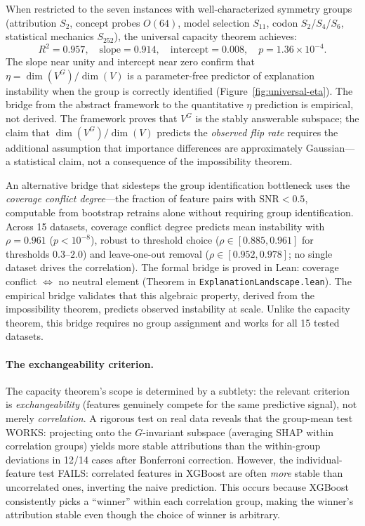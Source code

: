 \documentclass[11pt,a4paper]{article}
\begin{document}
When restricted to the seven instances with well-characterized symmetry groups
(attribution $S_2$, concept probes $O(64)$, model selection $S_{11}$, codon
$S_2$/$S_4$/$S_6$, statistical mechanics $S_{252}$), the universal capacity theorem
achieves:
\begin{equation}
  R^2 = 0.957, \quad \text{slope} = 0.914, \quad \text{intercept} = 0.008,
  \quad p = 1.36 \times 10^{-4}.
  \label{eq:eta-well-characterized}
\end{equation}
The slope near unity and intercept near zero confirm that
$\eta = \dim(V^G)/\dim(V)$ is a parameter-free predictor of explanation
instability when the group is correctly identified
(Figure~\ref{fig:universal-eta}).
The bridge from the abstract framework to the quantitative $\eta$ prediction is empirical, not derived.  The framework proves that $V^G$ is the stably answerable subspace; the claim that $\dim(V^G)/\dim(V)$ predicts the \emph{observed flip rate} requires the additional assumption that importance differences are approximately Gaussian---a statistical claim, not a consequence of the impossibility theorem.

An alternative bridge that sidesteps the group identification bottleneck uses the \emph{coverage conflict degree}---the fraction of feature pairs with $\text{SNR} < 0.5$, computable from bootstrap retrains alone without requiring group identification.  Across 15 datasets, coverage conflict degree predicts mean instability with $\rho = 0.961$ ($p < 10^{-8}$), robust to threshold choice ($\rho \in [0.885, 0.961]$ for thresholds $0.3$--$2.0$) and leave-one-out removal ($\rho \in [0.952, 0.978]$; no single dataset drives the correlation).  The formal bridge is proved in Lean: coverage conflict $\Leftrightarrow$ no neutral element (Theorem in \texttt{ExplanationLandscape.lean}).  The empirical bridge validates that this algebraic property, derived from the impossibility theorem, predicts observed instability at scale.  Unlike the capacity theorem, this bridge requires no group assignment and works for all 15 tested datasets.

\paragraph{The exchangeability criterion.}\label{sec:exchangeability}
The capacity theorem's scope is determined by a subtlety: the relevant criterion is \emph{exchangeability} (features genuinely compete for the same predictive signal), not merely \emph{correlation}.  A rigorous test on real data reveals that the group-mean test WORKS: projecting onto the $G$-invariant subspace (averaging SHAP within correlation groups) yields more stable attributions than the within-group deviations in 12/14 cases after Bonferroni correction.  However, the individual-feature test FAILS: correlated features in XGBoost are often \emph{more} stable than uncorrelated ones, inverting the naive prediction.  This occurs because XGBoost consistently picks a ``winner'' within each correlation group, making the winner's attribution stable even though the choice of winner is arbitrary.
\end{document}
